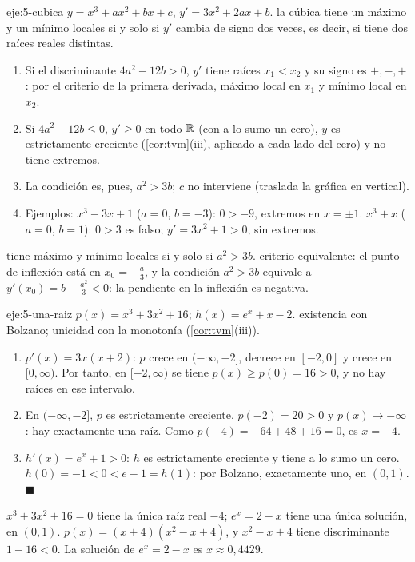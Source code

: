 \begin{solucion}{eje:5-cubica}
\datos $y=x^{3}+ax^{2}+bx+c$, $y'=3x^{2}+2ax+b$.
\planteamiento la cúbica tiene un máximo y un mínimo locales si y solo si $y'$ cambia de signo dos veces, es decir, si tiene dos raíces reales distintas.
\pasos
\begin{enumerate}[label=\arabic*.]
  \item Si el discriminante $4a^{2}-12b>0$, $y'$ tiene raíces $x_1<x_2$ y su signo es $+,-,+$: por el criterio de la primera derivada, máximo local en $x_1$ y mínimo local en $x_2$.
  \item Si $4a^{2}-12b\le0$, $y'\ge0$ en todo $\mathbb{R}$ (con a lo sumo un cero), $y$ es estrictamente creciente (\cref{cor:tvm}(iii), aplicado a cada lado del cero) y no tiene extremos.
  \item La condición es, pues, $a^{2}>3b$; $c$ no interviene (traslada la gráfica en vertical).
  \item Ejemplos: $x^{3}-3x+1$ ($a=0$, $b=-3$): $0>-9$, extremos en $x=\pm1$. $x^{3}+x$ ($a=0$, $b=1$): $0>3$ es falso; $y'=3x^{2}+1>0$, sin extremos.
\end{enumerate}
\resultado tiene máximo y mínimo locales si y solo si $a^{2}>3b$.
\comprobacion criterio equivalente: el punto de inflexión está en $x_0=-\frac a3$, y la condición $a^{2}>3b$ equivale a $y'(x_0)=b-\frac{a^{2}}{3}<0$: la pendiente en la inflexión es negativa.
\end{solucion}

\begin{solucion}{eje:5-una-raiz}
\datos $p(x)=x^{3}+3x^{2}+16$; $h(x)=e^{x}+x-2$.
\planteamiento existencia con Bolzano; unicidad con la monotonía (\cref{cor:tvm}(iii)).
\pasos
\begin{enumerate}[label=\arabic*.]
  \item $p'(x)=3x(x+2)$: $p$ crece en $(-\infty,-2]$, decrece en $[-2,0]$ y crece en $[0,\infty)$. Por tanto, en $[-2,\infty)$ se tiene $p(x)\ge p(0)=16>0$, y no hay raíces en ese intervalo.
  \item En $(-\infty,-2]$, $p$ es estrictamente creciente, $p(-2)=20>0$ y $p(x)\to-\infty$: hay exactamente una raíz. Como $p(-4)=-64+48+16=0$, es $x=-4$.
  \item $h'(x)=e^{x}+1>0$: $h$ es estrictamente creciente y tiene a lo sumo un cero. $h(0)=-1<0<e-1=h(1)$: por Bolzano, exactamente uno, en $(0,1)$. \hfill$\blacksquare$
\end{enumerate}
\resultado $x^{3}+3x^{2}+16=0$ tiene la única raíz real $-4$; $e^{x}=2-x$ tiene una única solución, en $(0,1)$.
\comprobacion $p(x)=(x+4)(x^{2}-x+4)$, y $x^{2}-x+4$ tiene discriminante $1-16<0$. La solución de $e^{x}=2-x$ es $x\approx0{,}4429$.
\end{solucion}

